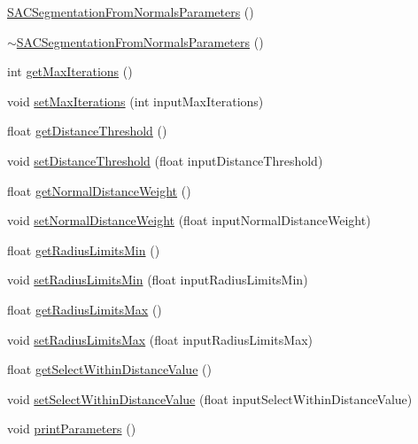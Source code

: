 \begin{DoxyCompactItemize}
\item 
\hyperlink{classSACSegmentationFromNormalsParameters_a4de6d2de0bb8211d0e68cddc9c5aecfd}{S\-A\-C\-Segmentation\-From\-Normals\-Parameters} ()
\item 
\hyperlink{classSACSegmentationFromNormalsParameters_ab4c7993734b6f0b6279f77796f9d9dfc}{$\sim$\-S\-A\-C\-Segmentation\-From\-Normals\-Parameters} ()
\item 
int \hyperlink{classSACSegmentationFromNormalsParameters_aad4b3e122d0f3366a8c69352aff4a0b9}{get\-Max\-Iterations} ()
\item 
void \hyperlink{classSACSegmentationFromNormalsParameters_a530bd70fb299f03b6d025a7a2c262578}{set\-Max\-Iterations} (int input\-Max\-Iterations)
\item 
float \hyperlink{classSACSegmentationFromNormalsParameters_a430e4a16261b07341d70447bad02bde7}{get\-Distance\-Threshold} ()
\item 
void \hyperlink{classSACSegmentationFromNormalsParameters_a1ff8083bc5124c7088a33fa03aef626b}{set\-Distance\-Threshold} (float input\-Distance\-Threshold)
\item 
float \hyperlink{classSACSegmentationFromNormalsParameters_a82aa78cb2d4b53ae90c54857236d8e2f}{get\-Normal\-Distance\-Weight} ()
\item 
void \hyperlink{classSACSegmentationFromNormalsParameters_afdc53f8041cf4adfbf62e6cee95e7916}{set\-Normal\-Distance\-Weight} (float input\-Normal\-Distance\-Weight)
\item 
float \hyperlink{classSACSegmentationFromNormalsParameters_add0e65f84e0d22c60a6f33a914fcde18}{get\-Radius\-Limits\-Min} ()
\item 
void \hyperlink{classSACSegmentationFromNormalsParameters_abcb5f0f3b6def5e134700c0f3e68aff6}{set\-Radius\-Limits\-Min} (float input\-Radius\-Limits\-Min)
\item 
float \hyperlink{classSACSegmentationFromNormalsParameters_ab6b151f1086d269cc0eb9ed6642daaa1}{get\-Radius\-Limits\-Max} ()
\item 
void \hyperlink{classSACSegmentationFromNormalsParameters_a18cdaeda0a78c26e6a44be76f44468e3}{set\-Radius\-Limits\-Max} (float input\-Radius\-Limits\-Max)
\item 
float \hyperlink{classSACSegmentationFromNormalsParameters_a6c5e2a0d0ce1895abd66217c685b9c05}{get\-Select\-Within\-Distance\-Value} ()
\item 
void \hyperlink{classSACSegmentationFromNormalsParameters_abf1bbc83ed4b4e85fb37c6cd975fb115}{set\-Select\-Within\-Distance\-Value} (float input\-Select\-Within\-Distance\-Value)
\item 
void \hyperlink{classSACSegmentationFromNormalsParameters_a5daeaddab0b859296fcb98e9970a0663}{print\-Parameters} ()
\end{DoxyCompactItemize}
